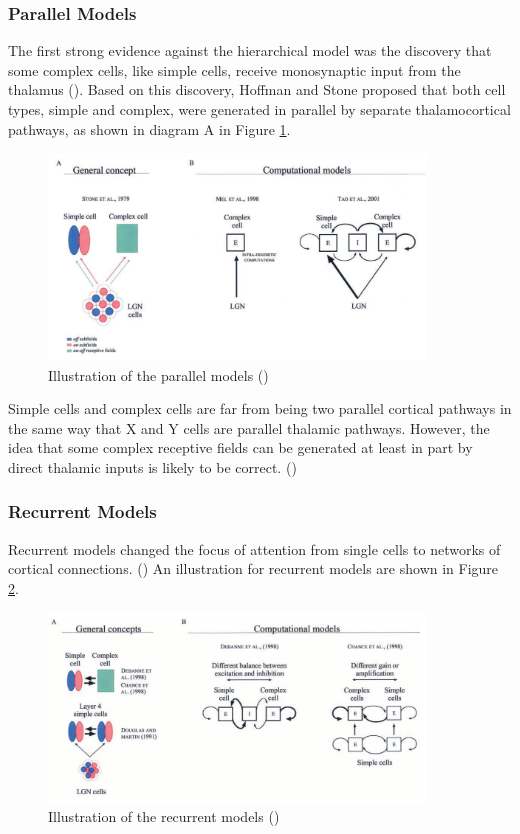 \subsubsection{Parallel Models}
\par The first strong evidence against the hierarchical model was the discovery that some complex cells, like simple cells, receive monosynaptic input from the thalamus (\cite{hoffmann1972relay}). Based on this discovery, Hoffman and Stone proposed that both cell types, simple and complex, were generated in parallel by separate thalamocortical pathways, as shown in diagram A in Figure \ref{fig:parallel-models}. 
\begin{figure}[H]
\centering
    \includegraphics[width=10cm]{figures/models/parallel-models.png}
     \caption{Illustration of the parallel models (\cite{martinez_complex_2003})}
     \label{fig:parallel-models}
\end{figure}

\par Simple cells and complex cells are far from being two parallel cortical pathways in the same way that X and Y cells are parallel thalamic pathways. However, the idea that some complex receptive fields can be generated at
least in part by direct thalamic inputs is likely to be correct. (\cite{martinez_complex_2003})

\subsubsection{Recurrent Models}
\par Recurrent models changed the focus of attention from single cells to networks of cortical connections. (\cite{martinez_complex_2003}) An illustration for recurrent models are shown in Figure \ref{fig:recurrent-models}.

\begin{figure}[H]
\centering
    \includegraphics[width=10cm]{figures/models/recurrent-models.png}
     \caption{Illustration of the recurrent models (\cite{martinez_complex_2003})}
     \label{fig:recurrent-models}
\end{figure}

